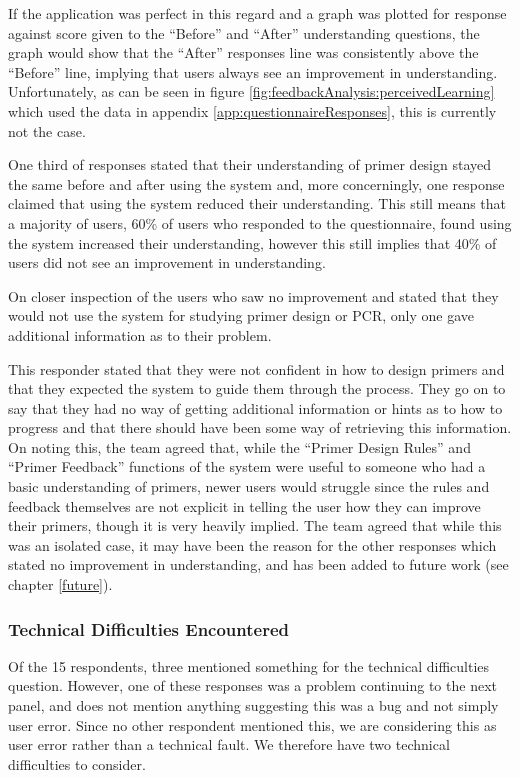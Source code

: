 If the application was perfect in this regard and a graph was plotted
for response against score given to the ``Before'' and ``After''
understanding questions, the graph would show that the ``After''
responses line was consistently above the ``Before'' line, implying
that users always see an improvement in understanding.
Unfortunately, as can be seen in figure
\ref{fig:feedbackAnalysis:perceivedLearning} which used the data in
appendix \ref{app:questionnaireResponses}, this is currently not the
case.

One third of responses stated that their understanding of primer
design stayed the same before and after using the system and, more
concerningly, one response claimed that using the system reduced their
understanding.
This still means that a majority of users, 60\% of users who responded
to the questionnaire, found using the system increased their
understanding, however this still implies that 40\% of users did not
see an improvement in understanding.

On closer inspection of the users who saw no improvement and stated
that they would not use the system for studying primer design or PCR,
only one gave additional information as to their problem.

This responder stated that they were not confident in how to design
primers and that they expected the system to guide them through the
process.
They go on to say that they had no way of getting additional
information or hints as to how to progress and that there should have
been some way of retrieving this information.
On noting this, the team agreed that, while the ``Primer Design
Rules'' and ``Primer Feedback'' functions of the system were useful to
someone who had a basic understanding of primers, newer users would
struggle since the rules and feedback themselves are not explicit
in telling the user how they can improve their primers, though it is
very heavily implied.
The team agreed that while this was an isolated case, it may have been
the reason for the other responses which stated no improvement in
understanding, and has been added to future work (see chapter
\ref{future}).

\subsubsection{Technical Difficulties Encountered}

Of the 15 respondents, three mentioned something for the technical
difficulties question.
However, one of these responses was a problem continuing to the next
panel, and does not mention anything suggesting this was a bug and not
simply user error.
Since no other respondent mentioned this, we are considering this as
user error rather than a technical fault.
We therefore have two technical difficulties to consider.

